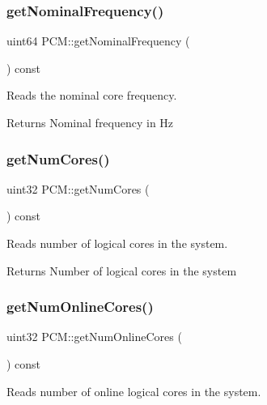 \subsubsection{\texorpdfstring{get\+Nominal\+Frequency()}{getNominalFrequency()}}
{\footnotesize\ttfamily uint64 P\+C\+M\+::get\+Nominal\+Frequency (\begin{DoxyParamCaption}{ }\end{DoxyParamCaption}) const}



Reads the nominal core frequency. 

\begin{DoxyReturn}{Returns}
Nominal frequency in Hz 
\end{DoxyReturn}
\mbox{\label{class_p_c_m_a18d1666c08f014378cf49c707fc978d1}} 
\subsubsection{\texorpdfstring{get\+Num\+Cores()}{getNumCores()}}
{\footnotesize\ttfamily uint32 P\+C\+M\+::get\+Num\+Cores (\begin{DoxyParamCaption}{ }\end{DoxyParamCaption}) const}



Reads number of logical cores in the system. 

\begin{DoxyReturn}{Returns}
Number of logical cores in the system 
\end{DoxyReturn}
\mbox{\label{class_p_c_m_a30210eb2ddc9eee6bfe1db4b159f922b}} 
\subsubsection{\texorpdfstring{get\+Num\+Online\+Cores()}{getNumOnlineCores()}}
{\footnotesize\ttfamily uint32 P\+C\+M\+::get\+Num\+Online\+Cores (\begin{DoxyParamCaption}{ }\end{DoxyParamCaption}) const}



Reads number of online logical cores in the system. 

